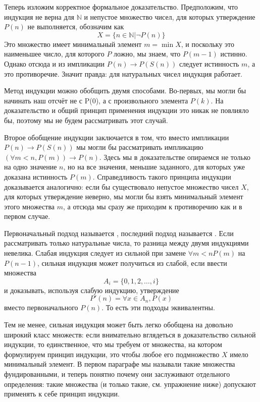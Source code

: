 Теперь изложим корректное формальное доказательство. Предположим, что индукция не верна для $\mathbb{N}$ и непустое множество чисел, для которых утверждение $P(n)$ не выполняется, обозначим как
$$X = \{n\in\mathbb{N}|\neg P(n)\}$$
Это множество имеет минимальный элемент $m=\min X$, и поскольку это наименьшее число, для которого $P$ ложно, мы знаем, что $P(m-1)$ истинно. Однако отсюда и из импликации $P(n)\to P(S(n))$ следует истинность $m$, а это противоречие. Значит правда: для натуральных чисел индукция работает.

Метод индукции можно обобщить двумя способами. Во-первых, мы могли бы начинать наш отсчёт не с P(0), а с произвольного элемента $P(k)$. На доказательство и общий принцип применения индукции это никак не повлияло бы, поэтому мы не будем рассматривать этот случай.

Второе обобщение индукции заключается в том, что вместо импликации $P(n)\to P(S(n))$ мы могли бы рассматривать импликацию $(\forall m<n, P(m))\to P(n)$. Здесь мы в доказательстве опираемся не только на одно значение $n$, но на все значения, меньшие заданного, для которых уже доказана истинность $P(m)$. Справедливость такого принципа индукции доказывается аналогично: если бы существовало непустое множество чисел $X$, для которых утверждение неверно, мы могли бы взять минимальный элемент этого множества $m$, а отсюда мы сразу же приходим к противоречию как и в первом случае.

Первоначальный подход называется , последний подход называется . Если рассматривать только натуральные числа, то разница между двумя индукциями невелика. Слабая индукция следует из сильной при замене $\forall m<n P(m)$ на $P(n-1)$, сильная индукция может получиться из слабой, если ввести множества
$$A_i = \{0, 1, 2, \ldots, i\}$$
и доказывать, используя слабую индукцию, утверждение
$$P'(n) = \forall x \in A_n, P(x)$$
вместо первоначального $P(n)$. То есть эти подходы эквивалентны.

Тем не менее, сильная индукция может быть легко обобщена на довольно широкий класс множеств: если внимательно вглядеться в доказательство сильной индукции, то единственное, что мы требуем от множества, на котором формулируем принцип индукции, это чтобы любое его подмножество $X$ имело минимальный элемент. В первом параграфе мы называли такие множества фундированными, и теперь понятно почему они заслуживают отдельного определения: такие множества (и только такие, см. упражнение ниже) допускают применять к себе принцип индукции.

